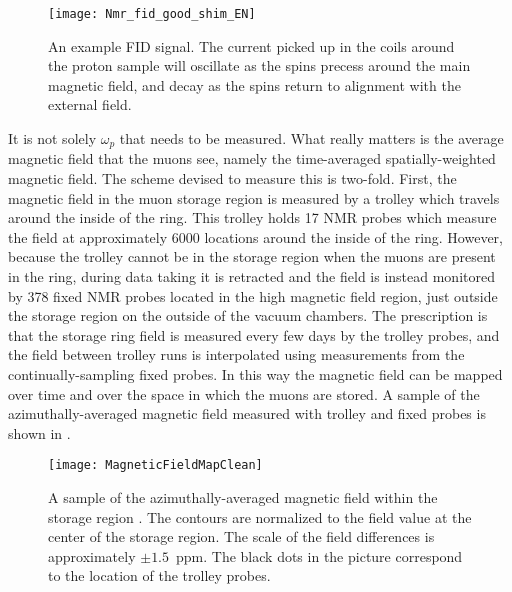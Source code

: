 \begin{figure}
    \centering
    \texttt{[image: Nmr\_fid\_good\_shim\_EN]}
    \caption[FID signal]{An example FID signal. The current picked up in the coils around the proton sample will oscillate as the spins precess around the main magnetic field, and decay as the spins return to alignment with the external field.}
    \label{fig:FID}
\end{figure}

It is not solely $\omega_{p}$ that needs to be measured. What really matters is the average magnetic field that the muons see, namely the time-averaged spatially-weighted magnetic field. The scheme devised to measure this is two-fold. First, the magnetic field in the muon storage region is measured by a trolley which travels around the inside of the ring. This trolley holds 17 NMR probes which measure the field at approximately 6000 locations around the inside of the ring. However, because the trolley cannot be in the storage region when the muons are present in the ring, during data taking it is retracted and the field is instead monitored by 378 fixed NMR probes located in the high magnetic field region, just outside the storage region on the outside of the vacuum chambers. The prescription is that the storage ring field is measured every few days by the trolley probes, and the field between trolley runs is interpolated using measurements from the continually-sampling fixed probes. In this way the magnetic field can be mapped over time and over the space in which the muons are stored. A sample of the azimuthally-averaged magnetic field measured with trolley and fixed probes is shown in .

\begin{figure}
    \centering
    \texttt{[image: MagneticFieldMapClean]}
    \caption[Azimuthally averaged magnetic field sample]{A sample of the azimuthally-averaged magnetic field within the storage region \cite{fieldmap}. The contours are normalized to the field value at the center of the storage region. The scale of the field differences is approximately $\pm 1.5$~ppm. The black dots in the picture correspond to the location of the trolley probes.}
    \label{fig:AverageMagneticField}
\end{figure}


